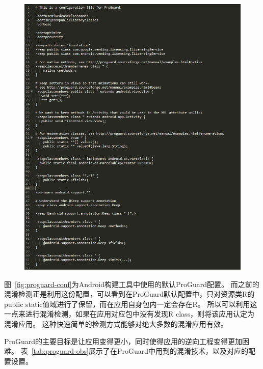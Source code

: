 \begin{figure}
	\centering
	\includegraphics[width=1\textwidth]{figure/proguard-conf.png}
\end{figure}

图~\ref{fig:proguard-conf}为Android构建工具中使用的默认ProGuard配置。
而之前的混淆检测正是利用这份配置，可以看到在ProGuard默认配置中，只对资源类R的public static值域进行了保留，而在应用自身包内一定会存在R。
所以可以利用这一点来进行混淆检测，如果在应用对应包中没有发现R class，则将该应用认定为混淆应用。
这种快速简单的检测方式能够对绝大多数的混淆应用有效。

ProGuard的主要目标是让应用变得更小，同时使得应用的逆向工程变得更加困难。
表~\ref{tab:proguard-obs}展示了在ProGuard中用到的混淆技术，以及对应的配置设置。

